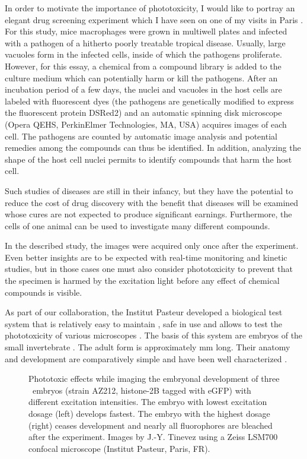 In order to motivate the importance of phototoxicity, I would like to
portray an elegant drug screening experiment which I have seen on one
of my visits in Paris \citep{Aulner2013}.  For this study, mice
macrophages were grown in multiwell plates and infected with a
pathogen of a hitherto poorly treatable tropical disease. Usually,
large vacuoles form in the infected cells, inside of which the
pathogens proliferate. However, for this essay, a chemical from a
compound library is added to the culture medium which can potentially
harm or kill the pathogens. After an incubation period of a few days,
the nuclei and vacuoles in the host cells are labeled with fluorescent
dyes (the pathogens are genetically modified to express the
fluorescent protein DSRed2) and an automatic spinning disk microscope
(Opera QEHS, PerkinElmer Technologies, MA, USA) acquires images of
each cell. The pathogens are counted by automatic image analysis and
potential remedies among the compounds can thus be identified. In
addition, analyzing the shape of the host cell nuclei permits to
identify compounds that harm the host cell.

Such studies of diseases are still in their infancy, but they have the
potential to reduce the cost of drug discovery with the benefit that
diseases will be examined whose cures are not expected to produce
significant earnings. Furthermore, the cells of one animal can be used
to investigate many different compounds.

In the described study, the images were acquired only once after the
experiment. Even better insights are to be expected with real-time
monitoring and kinetic studies, but in those cases one must also
consider phototoxicity to prevent that the specimen is harmed by the
excitation light before any effect of chemical compounds is visible.

As part of our collaboration, the Institut Pasteur developed a
biological test system that is relatively easy to maintain
\citep{Stiernagle2006}, safe in use and allows to test the
phototoxicity of various microscopes \citep{Tinevez2012}. The basis of
this system are embryos of the small invertebrate \celegans. The adult
form is approximately \unit[1]{mm} long.  Their anatomy and
development are comparatively simple and have been well characterized
\citep{Sulston1977,Durbin1987}.

\begin{figure}[hbtp]
  \centering
  \caption{Phototoxic effects while imaging the embryonal development
    of three \celegans\ embryos (strain AZ212, histone-2B tagged with
    eGFP) with different excitation intensities. The embryo with
    lowest excitation dosage (left) develops fastest. The embryo with
    the highest dosage (right) ceases development and nearly all
    fluorophores are bleached after the experiment. Images by
    J.-Y. Tinevez using a Zeiss LSM700 confocal microscope (Institut
    Pasteur, Paris, FR).}
  \label{fig:celegans-devel}
\end{figure}


